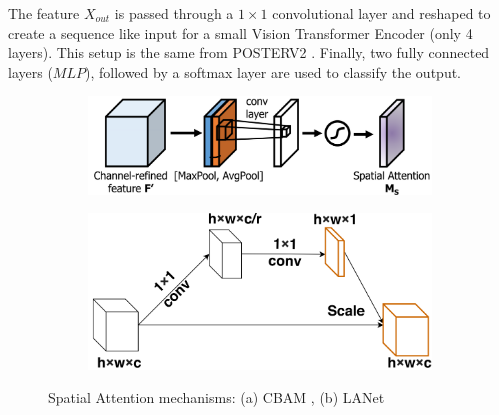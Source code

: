 The feature $X_{out}$ is passed through a $1 \times 1$ convolutional layer and reshaped to create a sequence like input for a small Vision Transformer Encoder (only 4 layers). This setup is the same from POSTERV2 \cite{RW_1_POSTERV2}. Finally, two fully connected layers ($MLP$), followed by a softmax layer are used to classify the output.

\begin{figure}[H]
   \centering
   \begin{subfigure}{0.4\textwidth}
       \includegraphics[width=\linewidth]{Images/CBAM.png}
       \caption{}
       \label{Spat_att_img_a}
   \end{subfigure}
   \begin{subfigure}{0.4\textwidth}
       \hspace{0.05cm}
       \includegraphics[width=\linewidth]{Images/LANET.png}
       \caption{}
       \label{Spat_att_img_b}
   \end{subfigure}
   \caption{Spatial Attention mechanisms: (a) CBAM \cite{CBAM}, (b) LANet \cite{LANET}}
   \label{Spat_att_img}
\end{figure}



